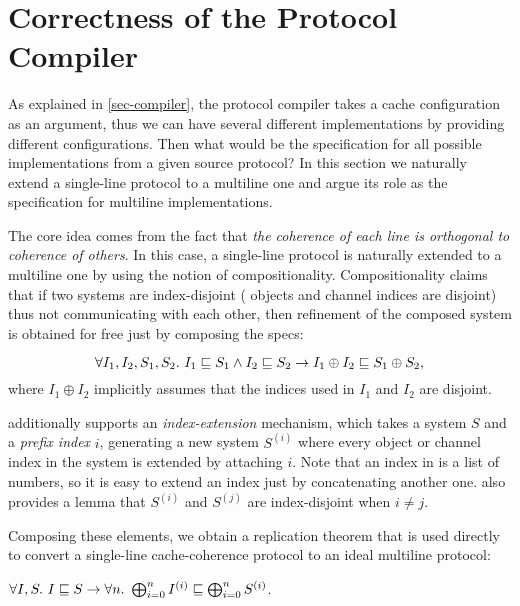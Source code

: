 \documentclass[sigplan,10pt,review,anonymous,screen]{acmart}\settopmatter{printfolios=true,printccs=false,printacmref=false}
\begin{document}
\section{Correctness of the Protocol Compiler}
\label{sec-appx-compiler-proof}

As explained in \autoref{sec-compiler}, the protocol compiler takes a cache configuration as an argument, thus we can have several different implementations by providing different configurations.
Then what would be the specification for all possible implementations from a given source protocol?
In this section we naturally extend a single-line \hemiola{} protocol to a multiline one and argue its role as the specification for multiline implementations.

The core idea comes from the fact that \emph{the coherence of each line is orthogonal to coherence of others}.
In this case, a single-line \hemiola{} protocol is naturally extended to a multiline one by using the notion of compositionality.
Compositionality claims that if two systems are index-disjoint (\ie{} objects and channel indices are disjoint) thus not communicating with each other, then refinement of the composed system is obtained for free just by composing the specs:
\begin{theorem}[Compositionality]
  \begin{displaymath}
    \forall I_1, I_2, S_1, S_2.\ \refines{I_1}{S_1} \land \refines{I_2}{S_2} \to
    \refines{I_1 \oplus I_2}{S_1 \oplus S_2},
  \end{displaymath}
  where $I_1 \oplus I_2$ implicitly assumes that the indices used in $I_1$ and $I_2$ are disjoint.
\end{theorem}

\hemiola{} additionally supports an \emph{index-extension} mechanism, which takes a system $S$ and a \emph{prefix index} $i$, generating a new system $S^{(i)}$ where every object or channel index in the system is extended by attaching $i$.
Note that an index in \hemiola{} is a list of numbers, so it is easy to extend an index just by concatenating another one.
\hemiola{} also provides a lemma that $S^{(i)}$ and $S^{(j)}$ are index-disjoint when $i \neq j$.

Composing these elements, we obtain a replication theorem that is used directly to convert a single-line cache-coherence protocol to an ideal multiline protocol:
\begin{theorem}[Replication]
  $\forall I, S.\ I \sqsubseteq S \to \forall n.\ \bigoplus^{n}_{i=0} I^{(i)} \sqsubseteq \bigoplus^{n}_{i=0} S^{(i)}$.
  \label{thm-replication}
\end{theorem}
\end{document}
